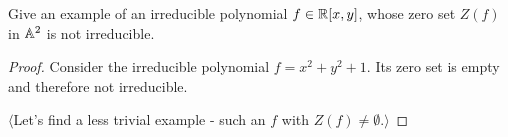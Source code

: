 \label{1.1.12}

Give an example of an irreducible polynomial $f \in \mathbb R[x, y]$, whose zero set
$Z(f)$ in $\mathbb A^2$ is not irreducible.

\begin{proof}
    Consider the irreducible polynomial $f = x^2 + y^2 + 1$. Its zero set is empty and therefore not irreducible.
    
    $\langle$Let's find a less trivial example - such an $f$ with $Z(f) \neq \emptyset$.$\rangle$
\end{proof}